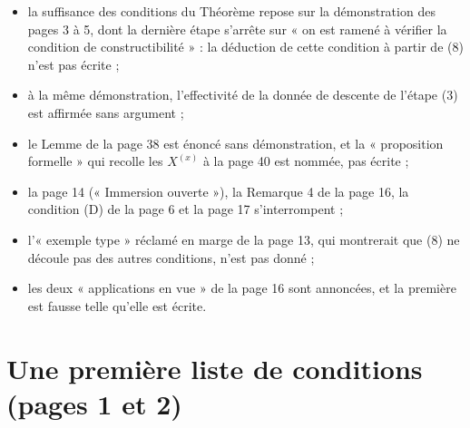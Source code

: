 \documentclass[11pt,a4paper]{article}
\begin{document}
\begin{itemize}
\item la suffisance des conditions du Théorème repose sur la démonstration
des pages 3 à 5, dont la dernière étape s'arrête sur « on est ramené à
vérifier la condition de constructibilité » : la déduction de cette
condition à partir de (8) n'est pas écrite ;
\item à la même démonstration, l'effectivité de la donnée de descente de
l'étape (3) est affirmée sans argument ;
\item le Lemme de la page 38 est énoncé sans démonstration, et la
« proposition formelle » qui recolle les $X^{(x)}$ à la page 40 est nommée,
pas écrite ;
\item la page 14 (« Immersion ouverte »), la Remarque 4 de la page 16, la
condition (D) de la page 6 et la page 17 s'interrompent ;
\item l'« exemple type » réclamé en marge de la page 13, qui montrerait que
(8) ne découle pas des autres conditions, n'est pas donné ;
\item les deux « applications en vue » de la page 16 sont annoncées, et la
première est fausse telle qu'elle est écrite.
\end{itemize}

\section*{Une première liste de conditions (pages 1 et 2)}
\end{document}
